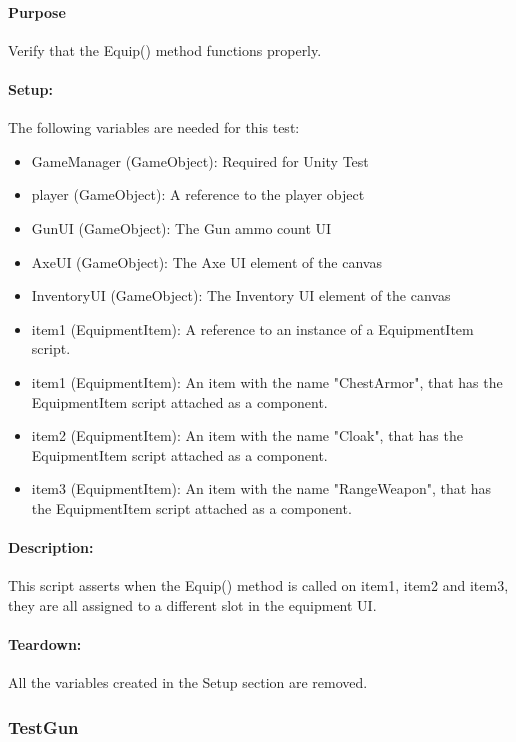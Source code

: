 \documentclass[12pt, titlepage]{article}
\begin{document}
{\paragraph{Purpose} Verify that the Equip() method functions properly.

\paragraph{Setup: } The following variables are needed for this test:
\begin{itemize}
	\item GameManager (GameObject): Required for Unity Test
	\item  player (GameObject): A reference to the player object
	\item  GunUI (GameObject): The Gun ammo count UI
	\item AxeUI (GameObject): The Axe UI element of the canvas
	\item InventoryUI (GameObject): The Inventory UI element of the canvas
	\item item1 (EquipmentItem): A reference to an instance of a EquipmentItem script.
	\item item1 (EquipmentItem): An item with the name "ChestArmor", that has the EquipmentItem script attached as a component.
	\item item2 (EquipmentItem): An item with the name "Cloak", that has the EquipmentItem script attached as a component.
	\item item3 (EquipmentItem): An item with the name "RangeWeapon", that has the EquipmentItem script attached as a component.
	
\end{itemize}
\paragraph{Description: }
This script asserts when the Equip() method is called on item1, item2 and item3, they are all assigned to a different slot in the equipment UI.

\paragraph{Teardown: } All the variables created in the Setup section are removed.
\subsubsection{Test\textunderscore Gun}

}
\end{document}
